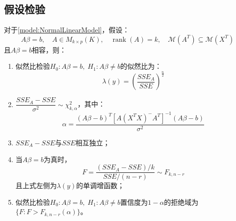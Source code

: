 \subsection{假设检验}
\begin{theorem}\label{theo:NormalLinearModelHypothesisTesting}
	对于\cref{model:NormalLinearModel}，假设：
	\begin{equation*}
		A\beta=b,\quad A\in M_{k\times p}(K),\quad\operatorname{rank}(A)=k,\quad\mathcal{M}(A^T)\subseteq\mathcal{M}(X^T)
	\end{equation*}
	且$A\beta=b$相容，则：
	\begin{enumerate}
		\item 似然比检验$H_0:A\beta=b,\;H_1:A\beta\ne b$的似然比为：
		\begin{equation*}
			\lambda(y)=\left(\frac{SSE_A}{SSE}\right)^\frac{n}{2}
		\end{equation*}
		\item $\dfrac{SSE_A-SSE}{\sigma^2}\sim\chi^2_{k,\alpha}$，其中：
		\begin{equation*}
			\alpha=\frac{(A\beta-b)^T[A(X^TX)^-A^T]^{-1}(A\beta-b)}{\sigma^2}
		\end{equation*}
		\item $SSE_A-SSE$与$SSE$相互独立；
		\item 当$A\beta=b$为真时，
		\begin{equation*}
			F=\frac{(SSE_A-SSE)/k}{SSE/(n-r)}\sim F_{k,n-r}
		\end{equation*}
		且上式左侧为$\lambda(y)$的单调增函数；
		\item 似然比检验$H_0:A\beta=b,\;H_1:A\beta\ne b$置信度为$1-\alpha$的拒绝域为$\{F:F>F_{k,n-r}(\alpha)\}$。
	\end{enumerate}
\end{theorem}
